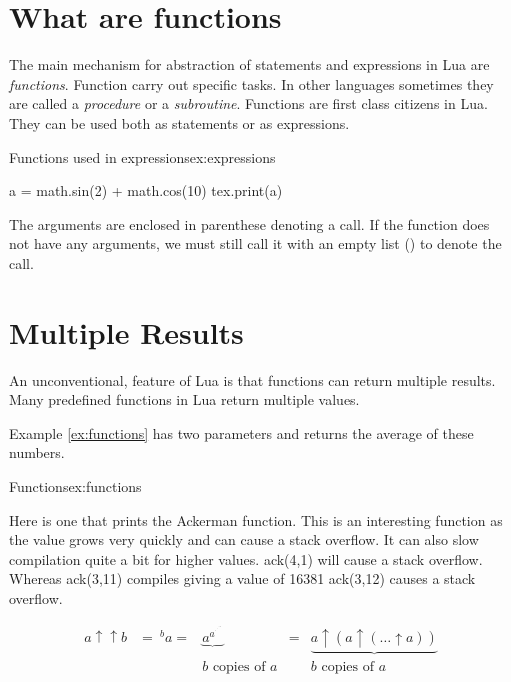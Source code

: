 \section{What are functions}

The main mechanism for abstraction of statements and expressions in Lua are \textit{functions}. Function carry out specific tasks. In other languages sometimes they are called a \textit{procedure} or a \textit{subroutine}. Functions are first class citizens in Lua. They can be used both as statements or as expressions.

\begin{texexample}{Functions used in expressions}{ex:expressions}
\begin{luacode}
a = math.sin(2) + math.cos(10)
tex.print(a)
\end{luacode}
\end{texexample}

The arguments are enclosed in parenthese denoting a call. If the function does not have any arguments, we must still call it with an empty list () to denote the call.

\section{Multiple Results}

An unconventional, feature of Lua is that functions can return multiple results. Many predefined functions in Lua return multiple values. 

Example \ref{ex:functions} has two parameters and returns the average of these numbers.

\begin{texexample}{Functions}{ex:functions}
\end{texexample}

Here is one that prints the Ackerman function. This is an interesting function as the value grows very quickly and can cause a stack overflow. It can also slow compilation quite a bit for higher values. ack(4,1) will cause a stack overflow. Whereas ack(3,11) compiles giving a value of 16381 ack(3,12) causes a stack overflow.  

\[
\begin{matrix}
   a\uparrow\uparrow b & = {\ ^{b}a}  = & \underbrace{a^{a^{{}^{.\,^{.\,^{.\,^a}}}}}} & 
   = & \underbrace{a\uparrow (a\uparrow(\dots\uparrow a))} 
\\  
    & & b\mbox{ copies of }a
    & & b\mbox{ copies of }a
  \end{matrix}
\]

